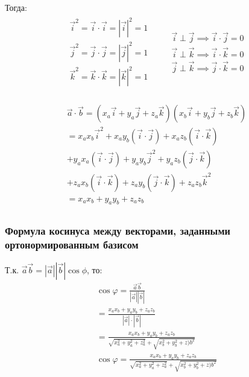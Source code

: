 Тогда:
\begin{gather*}
  \begin{matrix}
    \vec{i}^2 = \vec{i} \cdot \vec{i} = |\vec{i}|^2 = 1 \\
    \vec{j}^2 = \vec{j} \cdot \vec{j} = |\vec{j}|^2 = 1 \\ 
    \vec{k}^2 = \vec{k} \cdot \vec{k} = |\vec{k}|^2 = 1 \\
  \end{matrix}
  \qquad 
  \begin{matrix}
    \vec{i} \perp \vec{j} \implies \vec{i} \cdot \vec{j} = 0 \\ 
    \vec{i} \perp \vec{k} \implies \vec{i} \cdot \vec{k} = 0 \\ 
    \vec{j} \perp \vec{k} \implies \vec{j} \cdot \vec{k} = 0 \\ 
  \end{matrix}
\end{gather*}

\begin{gather*}
  \vec{a} \cdot \vec{b}
  = \left( x_a \vec{i} + y_a \vec{j} + z_a \vec{k} \right) \left( x_b \vec{i} + y_b \vec{j} + z_b \vec{k} \right) \\
  = x_a x_b \vec{i}^2 + x_a y_b (\vec{i} \cdot \vec{j}) + x_a z_b (\vec{i} \cdot \vec{k}) \\
  + y_a x_a (\vec{i} \cdot \vec{j}) + y_a y_b \vec{j}^2 + y_a z_b (\vec{j} \cdot \vec{k}) \\
  + z_a x_b (\vec{i} \cdot \vec{k}) + z_a y_b (\vec{j} \cdot \vec{k}) + z_a z_b \vec{k}^2 \\
  = x_a x_b + y_a y_b + z_a z_b \\
\end{gather*}

\begin{center}
\end{center}



\subsubsection{Формула косинуса между векторами, заданными ортонормированным базисом}

Т.к. $\vec{a} \vec{b} = |\vec{a}| |\vec{b}| \cos \phi$, то:
\begin{gather*}
  \cos \varphi = \frac{\vec{a} \vec{b}}{|\vec{a}| |\vec{b}|} \\
  = \frac{x_a x_b + y_a y_b + z_a z_b}{|\vec{a}| \cdot |\vec{b}|} \\
  = \frac{x_a x_b + y_a y_b + z_a z_b}{\sqrt{x_a^2 + y_a^2 + z_a^2} +\sqrt{x_b^2 + y_b^2 + z)b^2} } \\
  \boxed{\cos \varphi = \frac{x_a x_b + y_a y_b + z_a z_b}{\sqrt{x_a^2 + y_a^2 + z_a^2} +\sqrt{x_b^2 + y_b^2 + z)b^2}}}
\end{gather*}


